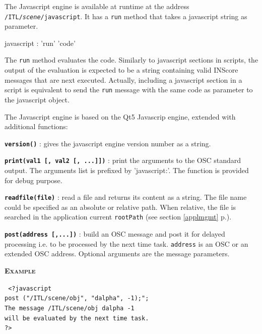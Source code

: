 \documentclass[a4paper,twoside]{report}
\newcommand{\fullref}[1]	{\ref{#1} p.\pageref{#1}}
\newcommand{\OSC}[1]		{\texttt{#1}}
\newcommand{\example}		{\textbf{\hspace{-1.5cm}\textbf{\textsc{Example }}}}
\newcommand{\note}	[1]		{\vspace{2mm}\textbf{\hspace{-1.03cm}\textbf{\textsc{Note #1}}}}
\let\olditemize\itemize
\let\oldenditemize\enditemize
\renewenvironment{itemize} 	{\olditemize \setlength{\itemsep}{1mm}}{\oldenditemize}
\newcommand{\sample}	[1]			{\vspace{-2mm}\begin{center}\colorbox{mygrey}{
								\begin{minipage}[t]{0.9\columnwidth} 
								{\small \texttt{#1}}
								\end{minipage}}\end{center}}
\begin{document}
The Javascript engine is available at runtime at the address \OSC{/ITL/\textit{scene}/javascript}. It has a \OSC{run} method that takes a javascript string as parameter.

\begin{rail} 
javascript :  'run' 'code'
\end{rail}

The \OSC{run} method evaluates the code. Similarly to javascript sections in scripts, the output of the evaluation is expected to be a string containing valid INScore messages that are next executed. 
Actually, including a javascript section in a script is equivalent to send the \OSC{run} message with the same code as parameter to the javascript object.

The Javascript engine is based on the Qt5 Javascrip engine, extended with additional functions:
\begin{itemize}
\item \textbf{\OSC{version()}} : gives the javascript engine version number as a string.
\item \textbf{\OSC{print(val1 [, val2 [, ...]])}} : print the arguments to the OSC standard output. The arguments list is prefixed by 'javascript:'. The function is provided for debug purpose.
\item \textbf{\OSC{readfile(file)}} : read a file and returns its content as a string. The file name could be specified as an absolute or relative path. When relative, the file is searched in the application current \OSC{rootPath} (see section \fullref{applmgmt}).
\item \textbf{\OSC{post(address [,...])}} : build an OSC message and post it for delayed processing i.e. to be processed by the next time task. \OSC{address} is an OSC or an extended OSC address. Optional arguments are the message parameters.
\end{itemize}


\example
\sample{
<?javascript \\
\hspace*{3mm} post ("/ITL/scene/obj", "dalpha", -1);";\\ 
\hspace*{3mm} The message /ITL/scene/obj dalpha -1 \\
\hspace*{3mm} will be evaluated by the next time task. \\
?>
}


%
\end{document}
